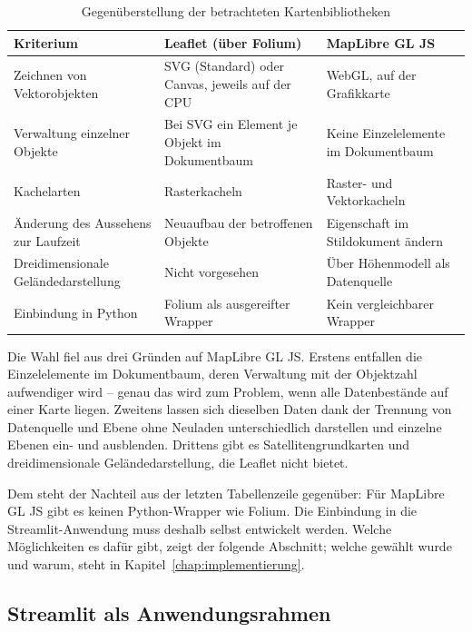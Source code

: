 \documentclass[12pt,a4paper]{report}
\begin{document}
\begin{table}[htbp]
\centering
\caption{Gegenüberstellung der betrachteten Kartenbibliotheken}
\label{tab:bibliotheken}
\small
\begin{tabular}{p{3.8cm} p{4.6cm} p{4.6cm}}
\toprule
\textbf{Kriterium} & \textbf{Leaflet (über Folium)} & \textbf{MapLibre GL JS} \\
\midrule
Zeichnen von Vektorobjekten
  & SVG (Standard) oder Canvas, jeweils auf der CPU
  & WebGL, auf der Grafikkarte \\
\addlinespace
Verwaltung einzelner Objekte
  & Bei SVG ein Element je Objekt im Dokumentbaum
  & Keine Einzelelemente im Dokumentbaum \\
\addlinespace
Kachelarten
  & Rasterkacheln
  & Raster- und Vektorkacheln \\
\addlinespace
Änderung des Aussehens zur Laufzeit
  & Neuaufbau der betroffenen Objekte
  & Eigenschaft im Stildokument ändern \\
\addlinespace
Dreidimensionale Geländedarstellung
  & Nicht vorgesehen
  & Über Höhenmodell als Datenquelle \\
\addlinespace
Einbindung in Python
  & Folium als ausgereifter Wrapper
  & Kein vergleichbarer Wrapper \\
\bottomrule
\end{tabular}
\end{table}

Die Wahl fiel aus drei Gründen auf MapLibre GL JS. Erstens entfallen die Einzelelemente im
Dokumentbaum, deren Verwaltung mit der Objektzahl aufwendiger wird -- genau das wird zum
Problem, wenn alle Datenbestände auf einer Karte liegen. Zweitens lassen sich dieselben
Daten dank der Trennung von Datenquelle und Ebene ohne Neuladen unterschiedlich darstellen
und einzelne Ebenen ein- und ausblenden. Drittens gibt es Satellitengrundkarten und
dreidimensionale Geländedarstellung, die Leaflet nicht bietet.

Dem steht der Nachteil aus der letzten Tabellenzeile gegenüber: Für MapLibre GL JS gibt es
keinen Python-Wrapper wie Folium. Die Einbindung in die Streamlit-Anwendung muss deshalb
selbst entwickelt werden. Welche Möglichkeiten es dafür gibt, zeigt der folgende Abschnitt;
welche gewählt wurde und warum, steht in Kapitel~\ref{chap:implementierung}.

\subsection{Streamlit als Anwendungsrahmen}
\label{subsec:streamlit}
\end{document}
